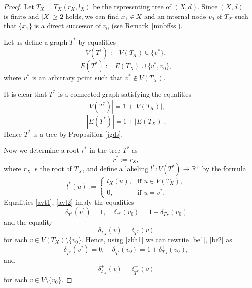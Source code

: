 \documentclass[10pt,a4paper]{amsart}
\begin{document}
\begin{proof}
Let $T_X=T_X(r_X,l_X)$ be the representing tree of $(X,d)$. Since $(X,d)$ is finite and $|X|\ge2$ holds, we can find $x_1 \in X$ and an internal node $v_0$ of $T_X$ such that $\{x_1\}$ is a direct successor of $v_0$ (see Remark~\ref{mnbffss}).

Let us define a graph $T^*$ by equalities
\begin{equation}
    \label{avt1}
V(T^*) := V(T_X)\cup\{v^*\},
\end{equation}
\begin{equation}
    \label{avt2}
E(T^*) := E(T_X)\cup\{v^*,v_0\},
\end{equation}
where $v^*$ is an arbitrary point such that $v^*\notin V(T_X)$.

It is clear that $T^*$ is a connected graph satisfying the equalities
\[
|V(T^*)| = 1 + |V(T_X)|,
\]
\[
|E(T^*)| = 1 + |E(T_X)|.
\]
Hence $T^*$ is a tree by Proposition \ref{jgds}.





Now we determine a root $r^*$ in the tree $T^*$ as
\begin{equation}
    \label{a1}
r^* := r_X,
\end{equation}
where $r_X$ is the root of $T_X$, and define a labeling
\(
l^* : V(T^*) \to \mathbb{R}^+
\)
by the formula
\begin{equation}
    \label{a2}
l^*(u) :=
\begin{cases}
l_X(u), & \text{if } u \in V(T_X),\\
0, & \text{if } u = v^*.
\end{cases}
\end{equation}
Equalities \eqref{avt1}, \eqref{avt2} imply the equalities
\begin{equation}
    \label{be1}
\delta_{T^*}(v^*) = 1,\quad
\delta_{T^*}(v_0) = 1 + \delta_{T_X}(v_0) 
\end{equation}
and the equality
\begin{equation}
    \label{be2}
\delta_{T_X}(v) = \delta_{T^*}(v)
\end{equation}
for each $v \in V(T_X)\setminus\{v_0\}$.
Hence, using \eqref{zbh1} we can rewrite \eqref{be1}, \eqref{be2} as
\begin{equation}
    \label{be3}
\delta^{+}_{T^*}(v^*) = 0,
\quad
\delta^{+}_{T^*}(v_0) = 1 + \delta^{+}_{T_X}(v_0), 
\end{equation}
and
\begin{equation}
    \label{be4}
\delta^{+}_{T_X}(v) = \delta^{+}_{T^*}(v)
\end{equation}
for each $v \in V\setminus\{v_0\}$.



\end{proof}
\end{document}
